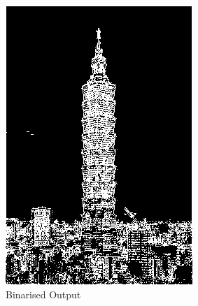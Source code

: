 \documentclass[12pt,a4paper]{report}
\begin{document}
  \begin{figure}[!htb]
    \begin{minipage}{0.49\textwidth}
      \centering
      \includegraphics[width=0.9\linewidth]{result_img/taipei101_Q4.png}
      \caption{Binarised Output}\label{Fig:Data5}
    \end{minipage}\hfill
    
    \end{figure}
\end{document}
